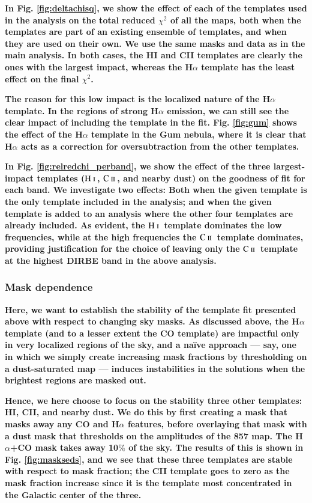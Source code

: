\documentclass{aa}
\newcommand{\mathsc}[1]{{\normalfont\textsc{#1}}}
\newcommand{\CII}{\ensuremath{\mathsc{C\ ii}}}
\newcommand{\HI}{\ensuremath{\mathsc{H\ i}}}
\begin{document}
\textbf{In Fig. \ref{fig:deltachisq}, we show the effect of each of the templates used in the analysis on the total reduced $\chi^2$ of all the maps, both when the templates are part of an existing ensemble of templates, and when they are used on their own. We use the same masks and data as in the main analysis. In both cases, the HI and CII templates are clearly the ones with the largest impact, whereas the H$\alpha$ template has the least effect on the final $\chi^2$.}

\textbf{The reason for this low impact is the localized nature of the H$\alpha$ template. In the regions of strong H$\alpha$ emission, we can still see the clear impact of including the template in the fit. Fig. \ref{fig:gum} shows the effect of the H$\alpha$ template in the Gum nebula, where it is clear that H$\alpha$ acts as a correction for oversubtraction from the other templates.}

\textbf{In Fig. \ref{fig:relredchi_perband}, we show the effect of the three largest-impact templates (\HI\,, \CII\,, and nearby dust) on the goodness of fit for each band. We investigate two effects: Both when the given template is the only template included in the analysis; and when the given template is added to an analysis where the other four templates are already included. As evident, the \HI\ template dominates the low frequencies, while at the high frequencies the \CII\ template dominates, providing justification for the choice of leaving only the \CII\ template at the highest DIRBE band in the above analysis.}

\subsubsection{Mask dependence}
\textbf{Here, we want to establish the stability of the template fit presented above with respect to changing sky masks. As discussed above, the H$\alpha$ template (and to a lesser extent the CO template) are impactful only in very localized regions of the sky, and a na\"ive approach --- say, one in which we simply create increasing mask fractions by thresholding on a dust-saturated map --- induces instabilities in the solutions when the brightest regions are masked out.}

\textbf{Hence, we here choose to focus on the stability three other templates: HI, CII, and nearby dust. We do this by first creating a mask that masks away any CO and H$\alpha$ features, before overlaying that mask with a dust mask that thresholds on the amplitudes of the 857 map. The H$\alpha$+CO mask takes away 10$\%$ of the sky. The results of this is shown in Fig. \ref{fig:maskseds}, and we see that these three templates are stable with respect to mask fraction; the CII template goes to zero as the mask fraction increase since it is the template most concentrated in the Galactic center of the three.}
\end{document}

